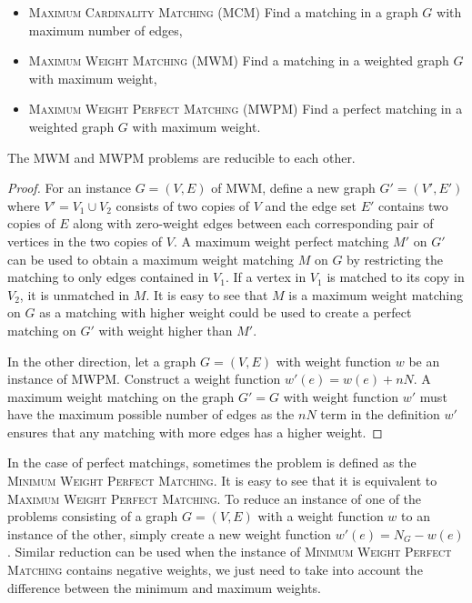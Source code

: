 \begin{itemize}
    \item \textsc{Maximum Cardinality Matching} (\textsc{MCM}) Find a matching in a graph $G$ with maximum number of edges,
    \item \textsc{Maximum Weight Matching} (\textsc{MWM}) Find a matching in a weighted graph $G$ with maximum weight,
    \item \textsc{Maximum Weight Perfect Matching} (\textsc{MWPM}) Find a perfect matching in a weighted graph $G$ with maximum weight.
\end{itemize}

\begin{theorem}\label{thm:reduction}
The \textsc{MWM} and \textsc{MWPM} problems are reducible to each other.

\begin{proof}
    For an instance $G=(V, E)$ of \textsc{MWM}, define a new graph $G' = (V', E')$ where $V' = V_1 \cup V_2$ consists of two copies of $V$ and the edge set $E'$ contains two copies of $E$ along with zero-weight edges between each corresponding pair of vertices in the two copies of $V$. A maximum weight perfect matching $M'$ on $G'$ can be used to obtain a maximum weight matching $M$ on $G$ by restricting the matching to only edges contained in $V_1$. If a vertex in $V_1$ is matched to its copy in $V_2$, it is unmatched in $M$. It is easy to see that $M$ is a maximum weight matching on $G$ as a matching with higher weight could be used to create a perfect matching on $G'$ with weight higher than $M'$. 
    
    In the other direction, let a graph $G=(V, E)$ with weight function $w$ be an instance of \textsc{MWPM}. Construct a weight function $w'(e) = w(e) + nN$. A maximum weight matching on the graph $G' = G$ with weight function $w'$ must have the maximum possible number of edges as the $nN$ term in the definition $w'$ ensures that any matching with more edges has a higher weight.    
\end{proof}
\end{theorem}

In the case of perfect matchings, sometimes the problem is defined as the \textsc{Minimum Weight Perfect Matching}. It is easy to see that it is equivalent to \textsc{Maximum Weight Perfect Matching}. To reduce an instance of one of the problems consisting of a graph $G = (V, E)$ with a weight function $w$ to an instance of the other, simply create a new weight function $w'(e) = N_G - w(e)$. Similar reduction can be used when the instance of \textsc{Minimum Weight Perfect Matching} contains negative weights, we just need to take into account the difference between the minimum and maximum weights.
